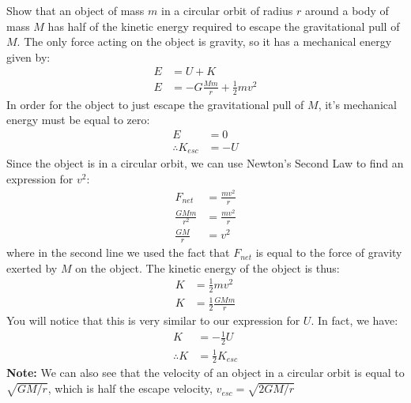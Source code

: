 \begin{example}{Show that an object of mass $m$ in a circular orbit of radius $r$ around a body of mass $M$ has half of the kinetic energy required to escape the gravitational pull of $M$.}
The only force acting on the object is gravity, so it has a mechanical energy given by:
\begin{align*}
E&=U+K\\
E&=-G\frac{Mm}{r}+\frac{1}{2}mv^2
\end{align*}
In order for the object to just escape the gravitational pull of $M$, it's mechanical energy must be equal to zero:
\begin{align*}
E&=0\\
\therefore K_{esc}&=-U
\end{align*}
Since the object is in a circular orbit, we can use Newton's Second Law to find an expression for $v^2$:
\begin{align*}
F_{net}&=\frac{mv^2}{r}\\
\frac{GMm}{r^2}&=\frac{mv^2}{r}\\
\frac{GM}{r}&=v^2
\end{align*}
where in the second line we used the fact that $F_{net}$ is equal to the force of gravity exerted by $M$ on the object. The kinetic energy of the object is thus:
\begin{align*}
K&=\frac{1}{2}mv^2\\
K&=\frac{1}{2}\frac{GMm}{r}
\end{align*}
You will notice that this is very similar to our expression for $U$. In fact, we have:
\begin{align*}
K&=-\frac{1}{2}U\\
\therefore K&=\frac{1}{2}K_{esc}
\end{align*}
\textbf{Note:} We can also see that the velocity of an object in a circular orbit is equal to $\sqrt{GM/r}$, which is half the escape velocity, $v_{esc}=\sqrt{2GM/r}$
\end{example}

